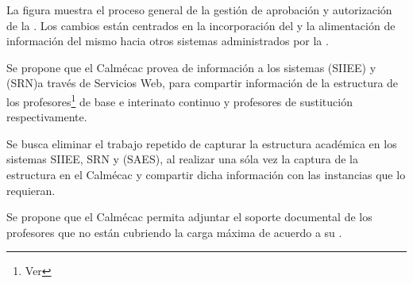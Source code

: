 	La figura  muestra el proceso general de la gestión de aprobación y autorización de la . Los cambios están centrados en la incorporación del  y la alimentación de información del mismo hacia otros sistemas administrados por la .
	
	

\begin{Citemize}
	\item Se propone que el Calmécac provea de información a los sistemas  (SIIEE) y  (SRN)a través de Servicios Web, para compartir información de la estructura de los profesores\footnote{Ver } de base e interinato continuo y profesores de sustitución respectivamente.
    \item Se busca eliminar el trabajo repetido de capturar la estructura académica en los sistemas SIIEE, SRN y  (SAES), al realizar una sóla vez la captura de la estructura en el Calmécac y compartir dicha información con las instancias que lo requieran.
     \item Se propone que el Calmécac permita adjuntar el soporte documental de los profesores que no están cubriendo la carga máxima de acuerdo a su .
    
\end{Citemize}

	\pagebreak
	
